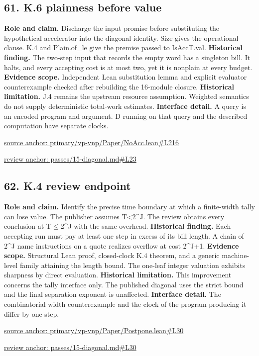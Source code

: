 \documentclass[11pt,letterpaper]{article}
\theoremstyle{definition}\newtheorem{definition}[theorem]{Definition}\newtheorem{example}[theorem]{Example}
\theoremstyle{remark}\newtheorem{remark}[theorem]{Remark}
\begin{document}
\subsection*{61. K.6 plainness before value}
\textbf{Role and claim.} Discharge the input promise before substituting the hypothetical accelerator into the diagonal identity. Size gives the operational clause. K.4 and Plain.of\_le give the premise passed to IsAccT.val.
\textbf{Historical finding.} The two-step input that records the empty word has a singleton bill. It halts, and every accepting cost is at most two, yet it is nonplain at every budget.
\textbf{Evidence scope.} Independent Lean substitution lemma and explicit evaluator counterexample checked after rebuilding the 16-module closure.
\textbf{Historical limitation.} J.4 remains the upstream resource assumption. Weighted semantics do not supply deterministic total-work estimates.
\textbf{Interface detail.} A query is an encoded program and argument. D running on that query and the described computation have separate clocks.
\par\href{https://github.com/nousentllc/VP-VNP-Review/blob/8a7976933b6b2b4ffda1ad3a0dfb5fc6b6f023e8/primary/vp-vnp/Paper/NoAcc.lean\#L216}{source anchor: primary/vp-vnp/Paper/NoAcc.lean\#L216}
\par\href{https://github.com/nousentllc/VP-VNP-Review/blob/8a7976933b6b2b4ffda1ad3a0dfb5fc6b6f023e8/passes/15-diagonal.md\#L23}{review anchor: passes/15-diagonal.md\#L23}
\goodbreak
{}
\hypertarget{claim.62}{}
\subsection*{62. K.4 review endpoint}
\textbf{Role and claim.} Identify the precise time boundary at which a finite-width tally can lose value. The publisher assumes T<2\textasciicircum{}J. The review obtains every conclusion at T\ensuremath{\le}2\textasciicircum{}J with the same overhead.
\textbf{Historical finding.} Each accepting run must pay at least one step in excess of its bill length. A chain of 2\textasciicircum{}J name instructions on a quote realizes overflow at cost 2\textasciicircum{}J+1.
\textbf{Evidence scope.} Structural Lean proof, closed-clock K.4 theorem, and a generic machine-level family attaining the length bound. The one-leaf integer valuation exhibits sharpness by direct evaluation.
\textbf{Historical limitation.} This improvement concerns the tally interface only. The published diagonal uses the strict bound and the final separation exponent is unaffected.
\textbf{Interface detail.} The combinatorial width counterexample and the clock of the program producing it differ by one step.
\par\href{https://github.com/nousentllc/VP-VNP-Review/blob/8a7976933b6b2b4ffda1ad3a0dfb5fc6b6f023e8/primary/vp-vnp/Paper/Postpone.lean\#L30}{source anchor: primary/vp-vnp/Paper/Postpone.lean\#L30}
\par\href{https://github.com/nousentllc/VP-VNP-Review/blob/8a7976933b6b2b4ffda1ad3a0dfb5fc6b6f023e8/passes/15-diagonal.md\#L30}{review anchor: passes/15-diagonal.md\#L30}
\goodbreak
{}
\hypertarget{claim.63}{}
\end{document}
